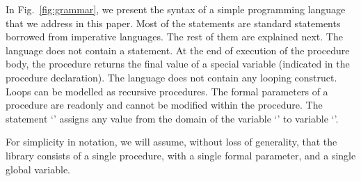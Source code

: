 In Fig.~\ref{fig:grammar}, we present the syntax of a simple
programming language that we address in this paper.
 Most of the statements are standard statements borrowed
from imperative languages. The rest of them are explained next.
The language does not contain a  statement.
At the end of execution of the procedure body, the procedure returns
the final value of a special variable (indicated in the procedure declaration).
The language does not contain any looping construct.
Loops can be modelled as recursive procedures.
The formal parameters of a procedure are readonly and cannot be
modified within the procedure.
The
statement `' assigns any value from the domain of the variable
`' to variable `'.

For simplicity in notation, we will assume, without loss of generality,
that the library consists of a single procedure, with a single formal
parameter, and a single global variable.